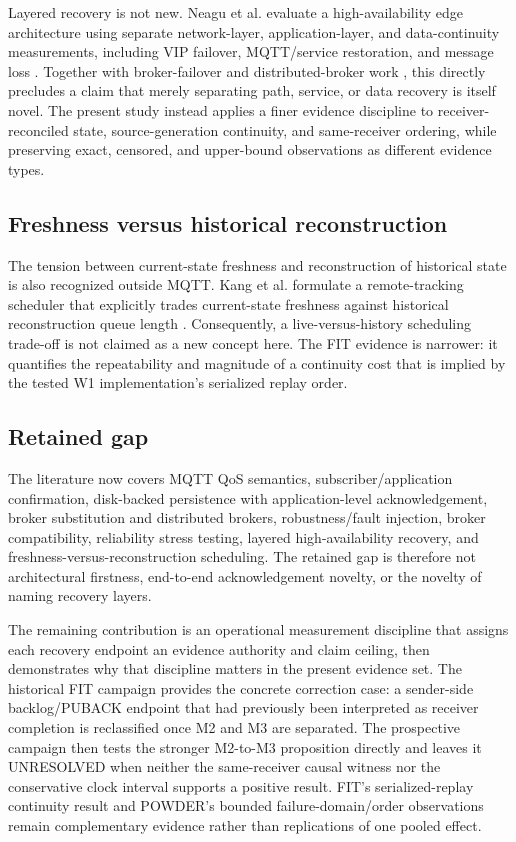 \documentclass[journal]{IEEEtran}
\begin{document}
Layered recovery is not new. Neagu et al. evaluate a high-availability edge architecture using separate network-layer, application-layer, and data-continuity measurements, including VIP failover, MQTT/service restoration, and message loss \cite{neagu2026}. Together with broker-failover and distributed-broker work \cite{chen2020,kamoun2024}, this directly precludes a claim that merely separating path, service, or data recovery is itself novel. The present study instead applies a finer evidence discipline to receiver-reconciled state, source-generation continuity, and same-receiver ordering, while preserving exact, censored, and upper-bound observations as different evidence types.

\subsection{Freshness versus historical reconstruction}

The tension between current-state freshness and reconstruction of historical state is also recognized outside MQTT. Kang et al. formulate a remote-tracking scheduler that explicitly trades current-state freshness against historical reconstruction queue length \cite{kang2026}. Consequently, a live-versus-history scheduling trade-off is not claimed as a new concept here. The FIT evidence is narrower: it quantifies the repeatability and magnitude of a continuity cost that is implied by the tested W1 implementation's serialized replay order.

\subsection{Retained gap}

The literature now covers MQTT QoS semantics, subscriber/application confirmation, disk-backed persistence with application-level acknowledgement, broker substitution and distributed brokers, robustness/fault injection, broker compatibility, reliability stress testing, layered high-availability recovery, and freshness-versus-reconstruction scheduling. The retained gap is therefore not architectural firstness, end-to-end acknowledgement novelty, or the novelty of naming recovery layers.

The remaining contribution is an operational measurement discipline that assigns each recovery endpoint an evidence authority and claim ceiling, then demonstrates why that discipline matters in the present evidence set. The historical FIT campaign provides the concrete correction case: a sender-side backlog/PUBACK endpoint that had previously been interpreted as receiver completion is reclassified once M2 and M3 are separated. The prospective campaign then tests the stronger M2-to-M3 proposition directly and leaves it UNRESOLVED when neither the same-receiver causal witness nor the conservative clock interval supports a positive result. FIT's serialized-replay continuity result and POWDER's bounded failure-domain/order observations remain complementary evidence rather than replications of one pooled effect.
\end{document}
